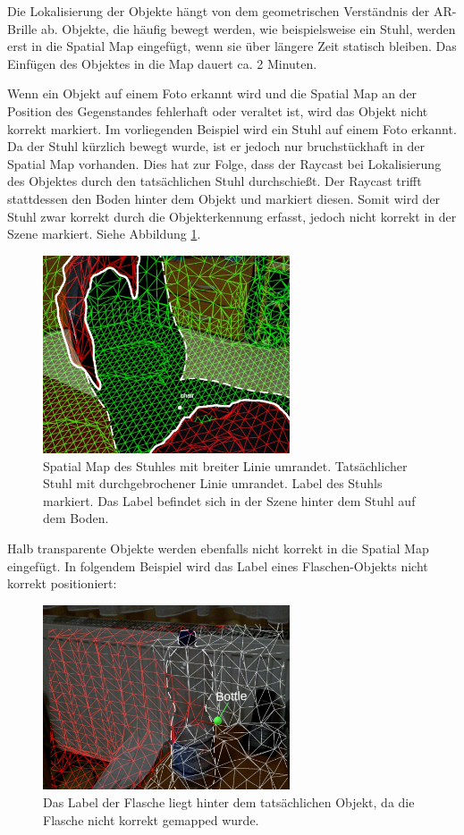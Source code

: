Die Lokalisierung der Objekte hängt von dem geometrischen Verständnis der AR-Brille ab. Objekte, die häufig bewegt werden, wie beispielsweise ein Stuhl, werden erst in die Spatial Map eingefügt, wenn sie über längere Zeit statisch bleiben. Das Einfügen des Objektes in die Map dauert ca. 2 Minuten. 

Wenn ein Objekt auf einem Foto erkannt wird und die Spatial Map an der Position des Gegenstandes fehlerhaft oder veraltet ist, wird das Objekt nicht korrekt markiert. Im vorliegenden Beispiel wird ein Stuhl auf einem Foto erkannt. Da der Stuhl kürzlich bewegt wurde, ist er jedoch nur bruchstückhaft in der Spatial Map vorhanden. Dies hat zur Folge, dass der Raycast bei Lokalisierung des Objektes durch den tatsächlichen Stuhl durchschießt. Der Raycast trifft stattdessen den Boden hinter dem Objekt und markiert diesen. Somit wird der Stuhl zwar korrekt durch die Objekterkennung erfasst, jedoch nicht korrekt in der Szene markiert. Siehe Abbildung \ref{img:stuhl}. 

\begin{figure}[H]
	\centering
	\includegraphics[width=0.65\textwidth]{images/ML_20201004_19.18.02_sup.jpg}
	\caption[Label setzen, bei fehlerhafter Spatial Map]{Spatial Map des Stuhles mit breiter Linie umrandet. Tatsächlicher Stuhl mit durchgebrochener Linie umrandet. Label des Stuhls markiert. Das Label befindet sich in der Szene hinter dem Stuhl auf dem Boden.}
	\label{img:stuhl}
\end{figure}

Halb transparente Objekte werden ebenfalls nicht korrekt in die Spatial Map eingefügt. In folgendem Beispiel wird das Label eines Flaschen-Objekts nicht korrekt positioniert: %

\begin{figure}[H]
	\centering
	\includegraphics[width=0.65\textwidth]{images/ML_20201004_19.12.13_2.jpg}
	\caption[Spatial Mapping transparenter Objekte]{Das Label der Flasche liegt hinter dem tatsächlichen Objekt, da die Flasche nicht korrekt gemapped wurde.}
	\label{img:flasche}
\end{figure}
